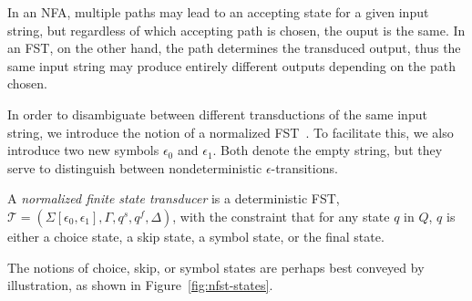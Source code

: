 In an NFA, multiple paths may lead to an accepting state for a given input
string, but regardless of which accepting path is chosen, the ouput is the
same. In an FST, on the other hand, the path determines the transduced output,
thus the same input string may produce entirely different outputs depending on
the path chosen.

In order to disambiguate between different transductions of the same input
string, we introduce the notion of a normalized
FST~\cite{grathwohl2016kleenex}. To facilitate this, we also introduce two new
symbols $\epsilon_0$ and $\epsilon_1$. Both denote the empty string, but they
serve to distinguish between nondeterministic $\epsilon$-transitions.

\begin{definition}[NFST]
  A \emph{normalized finite state transducer} is a deterministic FST,
  $\mathcal{T} = (\Sigma[\epsilon_0,\epsilon_1], \Gamma, q^s, q^f, \Delta)$,
  with the constraint that for any state $q$ in $Q$, $q$ is either a choice
  state, a skip state, a symbol state, or the final state.
\end{definition}

The notions of choice, skip, or symbol states are perhaps best conveyed by
illustration, as shown in Figure~\ref{fig:nfst-states}.

